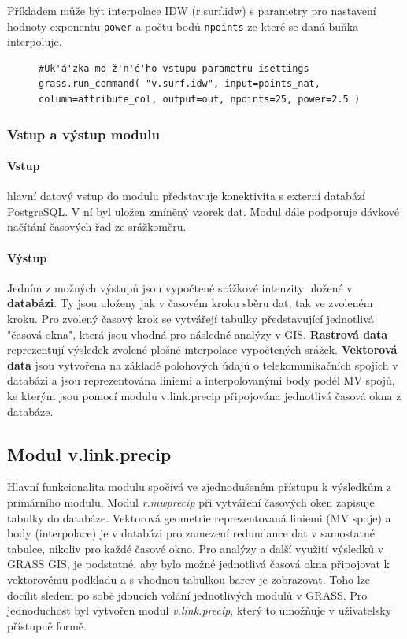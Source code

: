 \documentclass[a4paper,12pt,oneside]{report}
\begin{document}
Příkladem může být interpolace IDW (r.surf.idw) s parametry pro nastavení hodnoty exponentu \texttt{power} a počtu bodů \texttt{npoints} ze které se daná buňka interpoluje. 

\begin{figure}[h!]
\begin{footnotesize}
\lstset{extendedchars=false,
escapeinside=''}
\begin{lstlisting}[style=mybash]
#Uk'á'zka mo'ž'n'é'ho vstupu parametru isettings
grass.run_command( "v.surf.idw", input=points_nat,
column=attribute_col, output=out, npoints=25, power=2.5 )                            
\end{lstlisting}
\end{footnotesize} 
\end{figure}


 
\subsubsection{Vstup a výstup modulu}
\paragraph*{Vstup} hlavní datový vstup do modulu představuje konektivita s externí databází PostgreSQL. V ní byl uložen zmíněný vzorek dat.
Modul dále podporuje dávkové načítání časových řad ze srážkoměru.
\paragraph*{Výstup}
Jedním z možných výstupů jsou vypočtené srážkové intenzity uložené v \textbf{databázi}. Ty jsou uloženy jak v časovém kroku sběru dat, tak ve zvoleném kroku. Pro zvolený časový krok se vytvářejí tabulky představující jednotlivá "časová okna", která jsou vhodná pro následné analýzy v GIS.
\textbf{Rastrová data}  reprezentují výsledek zvolené plošné interpolace vypočtených srážek.
\textbf{Vektorová data} jsou vytvořena na základě polohových údajů o telekomunikačních spojích v databázi a jsou reprezentována  liniemi a  interpolovanými body podél MV spojů, ke kterým jsou pomocí modulu v.link.precip připojována jednotlivá časová okna z databáze.



\subsection{Modul v.link.precip}
Hlavní funkcionalita modulu spočívá ve zjednodušeném přístupu k výsledkům z primárního modulu. Modul \textit{r.mwprecip} při vytváření časových oken zapisuje tabulky do databáze. Vektorová geometrie reprezentovaná liniemi (MV spoje) a body (interpolace)  je v databázi pro zamezení redundance dat v samostatné tabulce, nikoliv pro každé časové okno. Pro analýzy a další využití výsledků v GRASS GIS, je podstatné, aby bylo možné jednotlivá časová okna připojovat k vektorovému podkladu a s vhodnou tabulkou barev je zobrazovat. 
Toho lze docílit sledem po sobě jdoucích volání jednotlivých modulů v GRASS. Pro jednoduchost byl vytvořen  modul \textit{v.link.precip}, který to umožňuje v uživatelsky přístupně formě. 
\end{document}
